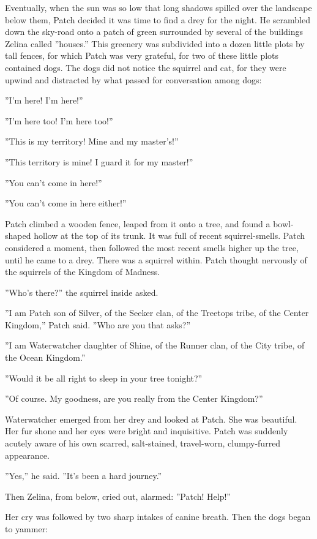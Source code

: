 \documentclass[12pt]{book}
\begin{document}
Eventually, when the sun was so low that long shadows spilled over the landscape below them, Patch decided it was time to find a drey for the night. He scrambled down the sky-road onto a patch of green surrounded by several of the buildings Zelina called ''houses.'' This greenery was subdivided into a dozen little plots by tall fences, for which Patch was very grateful, for two of these little plots contained dogs. The dogs did not notice the squirrel and cat, for they were upwind and distracted by what passed for conversation among dogs:

''I'm here! I'm here!''

''I'm here too! I'm here too!''

''This is my territory! Mine and my master's!''

''This territory is mine! I guard it for my master!''

''You can't come in here!''

''You can't come in here either!''

Patch climbed a wooden fence, leaped from it onto a tree, and found a bowl-shaped hollow at the top of its trunk. It was full of recent squirrel-smells. Patch considered a moment, then followed the most recent smells higher up the tree, until he came to a drey. There was a squirrel within. Patch thought nervously of the squirrels of the Kingdom of Madness.

''Who's there?'' the squirrel inside asked.

''I am Patch son of Silver, of the Seeker clan, of the Treetops tribe, of the Center Kingdom,'' Patch said. ''Who are you that asks?''

''I am Waterwatcher daughter of Shine, of the Runner clan, of the City tribe, of the Ocean Kingdom.''

''Would it be all right to sleep in your tree tonight?''

''Of course. My goodness, are you really from the Center Kingdom?''

Waterwatcher emerged from her drey and looked at Patch. She was beautiful. Her fur shone and her eyes were bright and inquisitive. Patch was suddenly acutely aware of his own scarred, salt-stained, travel-worn, clumpy-furred appearance.

''Yes,'' he said. ''It's been a hard journey.''

Then Zelina, from below, cried out, alarmed: ''Patch! Help!''

Her cry was followed by two sharp intakes of canine breath. Then the dogs began to yammer:
\end{document}
